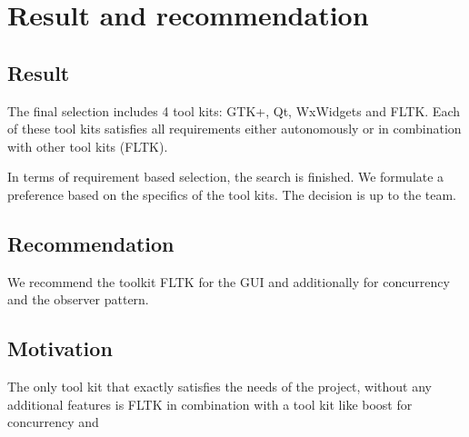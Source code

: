 \section{Result and recommendation}

\subsection{Result}

The final selection includes 4 tool kits: GTK+, Qt, WxWidgets and FLTK. Each
of these tool kits satisfies all requirements either autonomously or 
in combination with other tool kits (FLTK).

In terms of requirement based selection, the search is finished. We 
formulate a preference based on the specifics of the tool kits. 
The decision is up to the team. 

\subsection{Recommendation} 

We recommend the toolkit FLTK for the GUI and additionally  for 
concurrency and the observer pattern.

\subsection{Motivation}

The only tool kit that exactly satisfies the needs of the project,
without any additional features is FLTK in combination with a tool
kit like boost for concurrency and 

